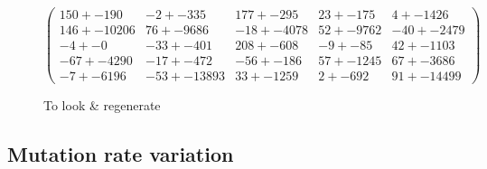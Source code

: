 \documentclass[]{report} %
\begin{document}
    \paragraph*{}
   

    \begin{figure}[H] 
            \centering
            \small
    $
            \begin{pmatrix}
                150 +- 190 & -2 +- 335 & 177 +- 295 & 23 +- 175 & 4 +- 1426 \\
                146 +- 10206 & 76 +- 9686 & -18 +- 4078 & 52 +- 9762 & -40 +- 2479 \\
                -4 +- 0 & -33 +- 401 & 208 +- 608 & -9 +- 85 & 42 +- 1103 \\
                -67 +- 4290 & -17 +- 472 & -56 +- 186 & 57 +- 1245 & 67 +- 3686 \\
                -7 +- 6196 & -53 +- 13893 & 33 +- 1259 & 2 +- 692 & 91 +- 1449 9 
            \end{pmatrix}
        $
            \caption{To look \& regenerate}
            \label{mat:ps300xg200xmr1-10-4}
    \end{figure}
    
    
    
    \subsection{Mutation rate variation}
    \paragraph*{}
    
\end{document}
